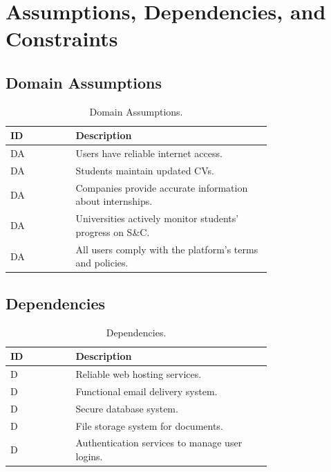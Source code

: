 \section{Assumptions, Dependencies, and Constraints}
\label{sec:assumptions_dependencies_constraints}%

\subsection{Domain Assumptions}
\label{subsec:domain_assumptions}%
\setcounter{da}{1}
\newcommand{\cda}{\theda\stepcounter{da}}

\begin{table}[H]
\centering
\footnotesize %
\begin{tabular}{ |l|p{0.75\linewidth}| }
    \hline
    \textbf{ID} & \textbf{Description} \\
    \hline
    DA\cda & Users have reliable internet access. \\
    \hline
    DA\cda & Students maintain updated CVs. \\
    \hline
    DA\cda & Companies provide accurate information about internships. \\
    \hline
    DA\cda & Universities actively monitor students' progress on S\&C. \\
    \hline
    DA\cda & All users comply with the platform's terms and policies. \\
    \hline
\end{tabular}
\caption{Domain Assumptions.}
\label{tab:domain_assumptions}
\end{table}

\subsection{Dependencies}
\label{subsec:dependencies}%
\setcounter{dep}{1}
\newcommand{\cdep}{\thedep\stepcounter{dep}}

\begin{table}[H]
\centering
\footnotesize
\begin{tabular}{ |l|p{0.75\linewidth}| }
    \hline
    \textbf{ID} & \textbf{Description} \\
    \hline
    D\cdep & Reliable web hosting services. \\
    \hline
    D\cdep & Functional email delivery system. \\
    \hline
    D\cdep & Secure database system. \\
    \hline
    D\cdep & File storage system for documents. \\
    \hline
    D\cdep & Authentication services to manage user logins. \\
    \hline
\end{tabular}
\caption{Dependencies.}
\label{tab:dependencies}
\end{table}

